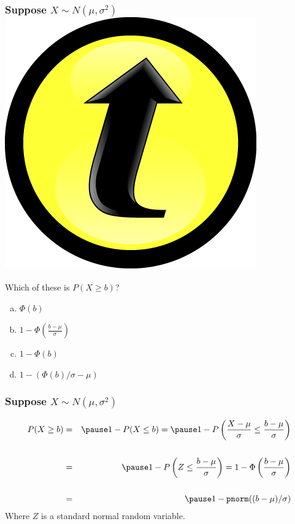 \documentclass[handout]{beamer}
\begin{document}
\begin{frame}
\frametitle{Suppose $X \sim N(\mu, \sigma^2)$ \hfill \includegraphics[scale = 0.05]{./images/clicker}}
Which of these is $P(X \geq b)$?
\begin{enumerate}[(a)]
	\item $\Phi(b)$
	\item $1 - \Phi\left( \frac{b - \mu}{\sigma} \right)$
	\item $1 - \Phi(b)$
	\item $1 - \left(\Phi(b)/\sigma - \mu\right)$
\end{enumerate}

\end{frame}
\begin{frame}
\frametitle{Suppose $X \sim N(\mu, \sigma^2)$}
\begin{eqnarray*}
	P(X \geq b) &=&\pause 1 - P(X\leq b) =\pause 1 - P\left( \frac{X-\mu}{\sigma} \leq \frac{b-\mu}{\sigma} \right) \\ \\
	&=&\pause 1 - P\left( Z \leq \frac{b-\mu}{\sigma} \right) = 1 - \Phi\left( \frac{b-\mu}{\sigma} \right)\\ \\
	&=&\pause 1 -\mbox{\texttt{pnorm}}((b-\mu)/\sigma)
\end{eqnarray*}
Where $Z$ is a standard normal random variable.
\end{frame}
\end{document}
